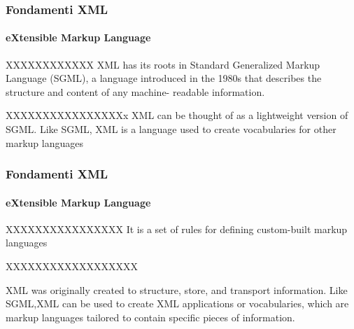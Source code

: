 


\begin{frame}
	\frametitle{Fondamenti XML}
	\framesubtitle{eXtensible Markup Language}
	\addtocounter{nframe}{1}

	\begin{block}{XXXXXXXXXXXX}
		XML has its roots in Standard Generalized Markup Language (SGML), a language
		introduced in the 1980s that describes the structure and content of any machine-
		readable information.
	\end{block}

	\begin{block} {XXXXXXXXXXXXXXXXx}
		XML can be
		thought of as a lightweight version of SGML. Like SGML, XML is a language used to create vocabularies for other markup languages

	\end{block}
\end{frame}

\begin{frame}
	\frametitle{Fondamenti XML}
	\framesubtitle{eXtensible Markup Language}
	\addtocounter{nframe}{1}

	\begin{block}{XXXXXXXXXXXXXXXX}
		It is a set of rules for defining custom-built markup languages
	\end{block}

	\begin{block} {XXXXXXXXXXXXXXXXXX}

		XML was originally created to structure, store, and transport information.
		Like SGML,XML can be used to create XML applications or vocabularies, which are markup
		languages tailored to contain specific pieces of information.

	\end{block}
\end{frame}


